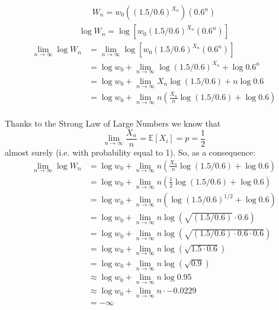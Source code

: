 \documentclass[12pt]{article}
\begin{document}
\begin{align}
    \begin{equation*}
        W_n = w_0 \left(\left(1.5/0.6\right)^{X_n}\right) \left(0.6^{n}\right)
    \end{equation*}
\end{align}
\begin{align}
    \begin{equation*}
        \log{W_n} = \log{\left[w_0 \left(1.5/0.6\right)^{X_n} \left(0.6^{n}\right)\right]}
  \end{equation*}    
\end{align}
\begin{equation*}
  \begin{split}
     \lim_{n\to\infty} \log{W_n} &= \lim_{n\to\infty} \log{\left[w_0 \left(1.5/0.6\right)^{X_n} \left(0.6^{n}\right)\right]}\\
    &= \log{w_0} + \lim_{n\to\infty} \log{\left(1.5/0.6\right)^{X_n}} + \log{0.6^{n}}\\
    &= \log{w_0} + \lim_{n\to\infty} X_n \log{\left(1.5/0.6\right)} + n \log{0.6}\\
    &= \log{w_0} + \lim_{n\to\infty} n \left(\tfrac{X_n}{n} \log{\left(1.5/0.6\right)} + \log{0.6}\right)\\
  \end{split}
\end{equation*}

Thanks to the Strong Law of Large Numbers we know that $$\lim_{n\to\infty}{\frac{X_n}{n} = \mathbb{E}[X_i] = p = \frac{1}{2}}$$ almost surely (i.e. with probability equal to 1). So, as a consequence:
\begin{equation*}
  \begin{split}
      \lim_{n\to\infty} \log{W_n} &= \log{w_0} + \lim_{n\to\infty} n \left(\tfrac{X_n}{n} \log{\left(1.5/0.6\right)} + \log{0.6}\right) \\
      &= \log{w_0} + \lim_{n\to\infty} n \left(\tfrac{1}{2} \log{\left(1.5/0.6\right)} + \log{0.6}\right) \\
      &= \log{w_0} + \lim_{n\to\infty} n \left(\log{\left(1.5/0.6\right)^{1/2}} + \log{0.6}\right) \\
      &= \log{w_0} + \lim_{n\to\infty} n \log{\left(\sqrt{\left(1.5/0.6\right)} \cdot 0.6\right)}\\
      &= \log{w_0} + \lim_{n\to\infty} n \log{\left(\sqrt{\left(1.5/0.6\right) \cdot 0.6 \cdot 0.6}\right)}\\
      &= \log{w_0} + \lim_{n\to\infty} n \log{\left(\sqrt{1.5 \cdot 0.6}\right)}\\
      &= \log{w_0} + \lim_{n\to\infty} n \log{\left(\sqrt{0.9}\right)}\\
      &\approx \log{w_0} + \lim_{n\to\infty} n \log{0.95}\\
      &\approx \log{w_0} + \lim_{n\to\infty} n \cdot-0.0229 \\
      &= -\infty
  \end{split}
\end{equation*}
\end{document}
